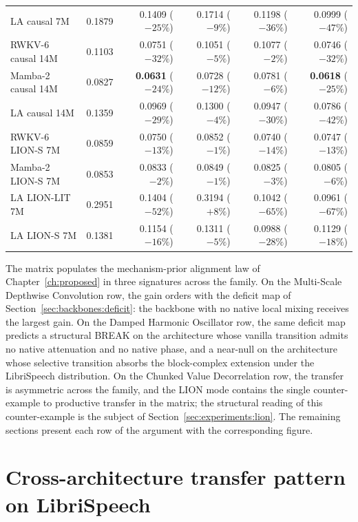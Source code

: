 \begin{table}[!htbp]
\begin{tabularx}{\linewidth}{@{}X r r r r r@{}}
LA causal 7M           & 0.1879 & 0.1409 ($-25\%$) & 0.1714 ($-9\%$) & 0.1198 ($-36\%$) & 0.0999 ($-47\%$) \\
\addlinespace
RWKV-6 causal 14M      & 0.1103 & 0.0751 ($-32\%$) & 0.1051 ($-5\%$) & 0.1077 ($-2\%$) & 0.0746 ($-32\%$) \\
Mamba-2 causal 14M     & 0.0827 & \textbf{0.0631} ($-24\%$) & 0.0728 ($-12\%$) & 0.0781 ($-6\%$) & \textbf{0.0618} ($-25\%$) \\
LA causal 14M          & 0.1359 & 0.0969 ($-29\%$) & 0.1300 ($-4\%$) & 0.0947 ($-30\%$) & 0.0786 ($-42\%$) \\
\addlinespace
RWKV-6 LION-S 7M       & 0.0859 & 0.0750 ($-13\%$) & 0.0852 ($-1\%$) & 0.0740 ($-14\%$) & 0.0747 ($-13\%$) \\
Mamba-2 LION-S 7M      & 0.0853 & 0.0833 ($-2\%$) & 0.0849 ($-1\%$) & 0.0825 ($-3\%$) & 0.0805 ($-6\%$) \\
LA LION-LIT 7M         & 0.2951 & 0.1404 ($-52\%$) & 0.3194 ($+8\%$) & 0.1042 ($-65\%$) & 0.0961 ($-67\%$) \\
LA LION-S 7M           & 0.1381 & 0.1154 ($-16\%$) & 0.1311 ($-5\%$) & 0.0988 ($-28\%$) & 0.1129 ($-18\%$) \\
\bottomrule
\end{tabularx}
\end{table}

The matrix populates the mechanism-prior alignment law of
Chapter~\ref{ch:proposed} in three signatures across the family.
On the Multi-Scale Depthwise Convolution row, the gain orders
with the deficit map of Section~\ref{sec:backbones:deficit}: the
backbone with no native local mixing receives the largest gain.
On the Damped Harmonic Oscillator row, the same deficit map
predicts a structural BREAK on the architecture whose vanilla
transition admits no native attenuation and no native phase, and
a near-null on the architecture whose selective transition
absorbs the block-complex extension under the LibriSpeech
distribution. On the Chunked Value Decorrelation row, the
transfer is asymmetric across the family, and the LION mode
contains the single counter-example to productive transfer in
the matrix; the structural reading of this counter-example is
the subject of Section~\ref{sec:experiments:lion}. The
remaining sections present each row of the argument with the
corresponding figure.

\section{Cross-architecture transfer pattern on LibriSpeech}\label{sec:experiments:transfer}

